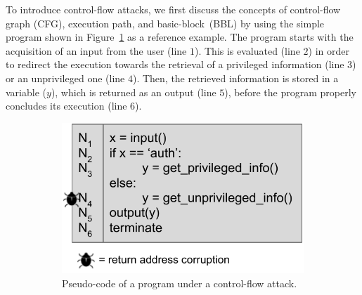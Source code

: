 To introduce control-flow attacks, we first discuss the concepts of 
control-flow graph (CFG), execution path, and basic-block~(BBL) by using the 
simple program shown in Figure~\ref{fig:problem-setting-code} as a reference 
example. 
The program starts with the acquisition of an input from the user (line $1$). 
This is evaluated (line $2$) in order to redirect the execution towards the 
retrieval of a privileged information (line $3$) or an unprivileged one (line 
$4$). Then, the retrieved information is stored in a variable ($y$), which is 
returned as an output (line $5$), before the program properly concludes its 
execution (line $6$). 

\begin{figure}[t]
	\centering
	\begin{subfigure}[t]{0.45\textwidth}
		\centering
		\includegraphics[width=\linewidth]{fig_c4/problem-setting-code.pdf}
		\caption{Pseudo-code of a program under a control-flow attack.}
		\label{fig:problem-setting-code}
	\end{subfigure}
	\hfill
	\begin{subfigure}[t]{0.4\textwidth}
		\centering

\end{subfigure}
\end{figure}
